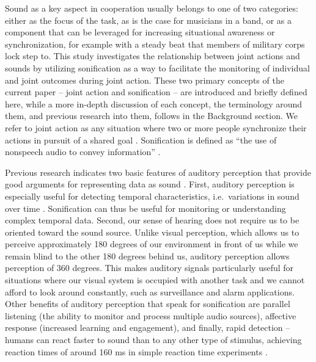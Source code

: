 \documentclass[10pt,a4paper,onecolumn]{article}
\begin{document}
Sound as a key aspect in cooperation usually belongs to one of two categories: either as the focus of the task, as is the case for musicians in a band, or as a component that can be leveraged for increasing situational awareness or synchronization, for example with a steady beat that members of military corps lock step to. This study investigates the relationship between joint actions and sounds by utilizing sonification as a way to facilitate the monitoring of individual and joint outcomes during joint action. These two primary concepts of the current paper -- joint action and sonification -- are introduced and briefly defined here, while a more in-depth discussion of each concept, the terminology around them, and previous research into them, follows in the Background section. We refer to joint action as any situation where two or more people synchronize their actions in pursuit of a shared goal \autocite{knoblichPsychologicalResearchJoint2011}. Sonification is defined as ``the use of nonspeech audio to convey information'' \autocite[p.~4]{kramerSonificationReportStatus1999}.

Previous research indicates two basic features of auditory perception that provide good arguments for representing data as sound \autocite{kramerSonificationReportStatus1999}. First, auditory perception is especially useful for detecting temporal characteristics, i.e.~variations in sound over time \autocite{hildebrandtShortPaperEnhancing2014}. Sonification can thus be useful for monitoring or understanding complex temporal data. Second, our sense of hearing does not require us to be oriented toward the sound source. Unlike visual perception, which allows us to perceive approximately 180 degrees of our environment in front of us while we remain blind to the other 180 degrees behind us, auditory perception allows perception of 360 degrees. This makes auditory signals particularly useful for situations where our visual system is occupied with another task and we cannot afford to look around constantly, such as surveillance and alarm applications. Other benefits of auditory perception that speak for sonification are parallel listening (the ability to monitor and process multiple audio sources), affective response (increased learning and engagement), and finally, rapid detection -- humans can react faster to sound than to any other type of stimulus, achieving reaction times of around 160 ms in simple reaction time experiments \autocite{kosinskiLiteratureReviewReaction2008,kramerSonificationReportStatus1999}.
\end{document}
